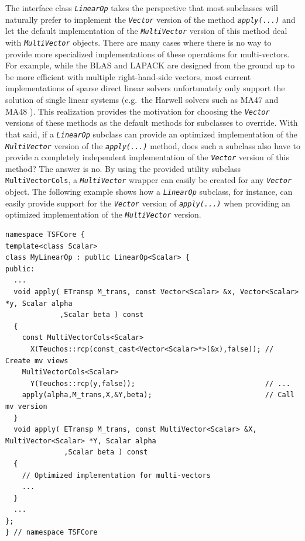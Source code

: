 The interface class {}\texttt{\textit{LinearOp}} takes the perspective
that most subclasses will naturally prefer to implement the
{}\texttt{\textit{Vector}} version of the method
{}\texttt{\textit{apply(\-...)}} and let the default implementation of
the {}\texttt{\textit{Multi\-Vector}} version of this method deal with
{}\texttt{\textit{Multi\-Vector}} objects.  There are many cases where
there is no way to provide more specialized implementations of these
operations for multi-vectors.  For example, while the BLAS and LAPACK
are designed from the ground up to be more efficient with multiple
right-hand-side vectors, most current implementations of sparse direct
linear solvers unfortunately only support the solution of single
linear systems (e.g.~the Harwell solvers such as MA47 and MA48
{}\cite{ref:hsl_1995}).  This realization provides the motivation for
choosing the {}\texttt{\textit{Vector}} versions of these methods as
the default methods for subclasses to override.  With that said, if a
{}\texttt{\textit{LinearOp}} subclass can provide an optimized
implementation of the {}\texttt{\textit{Multi\-Vector}} version of the
{}\texttt{\textit{apply(\-...)}} method, does such a subclass also
have to provide a completely independent implementation of the
{}\texttt{\textit{Vector}} version of this method?  The answer is no.
By using the provided utility subclass {}\texttt{MultiVectorCols}, a
{}\texttt{\textit{Multi\-Vector}} wrapper can easily be created for
any {}\texttt{\textit{Vector}} object.  The following example shows
how a {}\texttt{\textit{LinearOp}} subclass, for instance, can easily
provide support for the {}\texttt{\textit{Vector}} version of
{}\texttt{\textit{apply(\-...)}} when providing an optimized
implementation of the {}\texttt{\textit{Multi\-Vector}} version.

{\scriptsize\begin{verbatim}
namespace TSFCore {
template<class Scalar>
class MyLinearOp : public LinearOp<Scalar> {
public:
  ...
  void apply( ETransp M_trans, const Vector<Scalar> &x, Vector<Scalar> *y, Scalar alpha
             ,Scalar beta ) const
  {
    const MultiVectorCols<Scalar>
      X(Teuchos::rcp(const_cast<Vector<Scalar>*>(&x),false)); // Create mv views
    MultiVectorCols<Scalar>
      Y(Teuchos::rcp(y,false));                               // ...
    apply(alpha,M_trans,X,&Y,beta);                           // Call mv version
  }
  void apply( ETransp M_trans, const MultiVector<Scalar> &X, MultiVector<Scalar> *Y, Scalar alpha
              ,Scalar beta ) const
  {
    // Optimized implementation for multi-vectors
    ...
  }
  ...
};
} // namespace TSFCore
\end{verbatim}}

